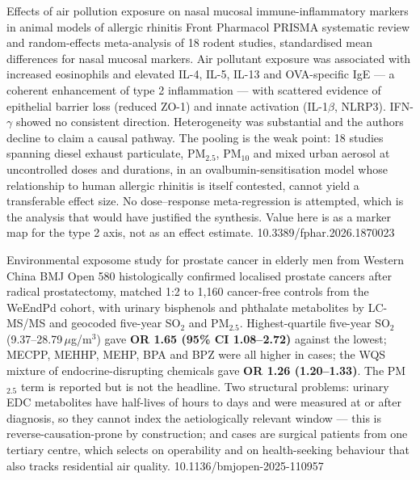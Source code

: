\documentclass[10pt]{article}
\begin{document}
{Effects of air pollution exposure on nasal mucosal immune-inflammatory markers in animal
models of allergic rhinitis}
{Front Pharmacol}
{PRISMA systematic review and random-effects meta-analysis of 18 rodent studies,
standardised mean differences for nasal mucosal markers. Air pollutant exposure was
associated with increased eosinophils and elevated IL-4, IL-5, IL-13 and OVA-specific IgE
--- a coherent enhancement of type 2 inflammation --- with scattered evidence of
epithelial barrier loss (reduced ZO-1) and innate activation (IL-1$\beta$, NLRP3).
IFN-$\gamma$ showed no consistent direction. Heterogeneity was substantial and the
authors decline to claim a causal pathway. The pooling is the weak point: 18 studies
spanning diesel exhaust particulate, PM$_{2.5}$, PM$_{10}$ and mixed urban aerosol at
uncontrolled doses and durations, in an ovalbumin-sensitisation model whose relationship
to human allergic rhinitis is itself contested, cannot yield a transferable effect size.
No dose--response meta-regression is attempted, which is the analysis that would have
justified the synthesis. Value here is as a marker map for the type 2 axis, not as an
effect estimate.}
{10.3389/fphar.2026.1870023}


{Environmental exposome study for prostate cancer in elderly men from Western China}
{BMJ Open}
{580 histologically confirmed localised prostate cancers after radical prostatectomy,
matched 1:2 to 1,160 cancer-free controls from the WeEndPd cohort, with urinary
bisphenols and phthalate metabolites by LC-MS/MS and geocoded five-year SO$_2$ and
PM$_{2.5}$. Highest-quartile five-year SO$_2$ (9.37--28.79\,$\mu$g/m$^3$) gave
\textbf{OR 1.65 (95\% CI 1.08--2.72)} against the lowest; MECPP, MEHHP, MEHP, BPA and BPZ
were all higher in cases; the WQS mixture of endocrine-disrupting chemicals gave
\textbf{OR 1.26 (1.20--1.33)}. The PM$_{2.5}$ term is reported but is not the headline.
Two structural problems: urinary EDC metabolites have half-lives of hours to days and
were measured at or after diagnosis, so they cannot index the aetiologically relevant
window --- this is reverse-causation-prone by construction; and cases are surgical
patients from one tertiary centre, which selects on operability and on health-seeking
behaviour that also tracks residential air quality.}
{10.1136/bmjopen-2025-110957}
\end{document}

